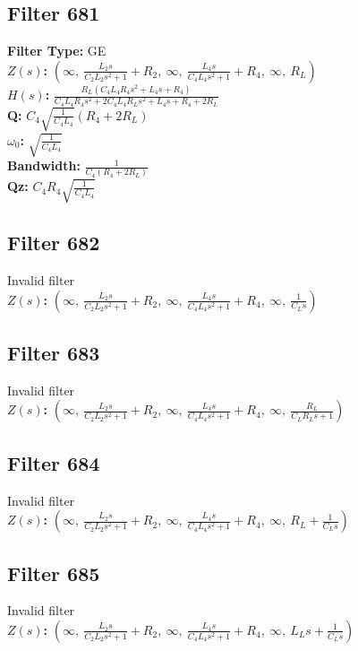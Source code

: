 \documentclass{article}
\begin{document}
\subsection*{Filter 681}
\textbf{Filter Type:} GE \\ 
\textbf{$Z(s)$:} $\left( \infty, \  \frac{L_{2} s}{C_{2} L_{2} s^{2} + 1} + R_{2}, \  \infty, \  \frac{L_{4} s}{C_{4} L_{4} s^{2} + 1} + R_{4}, \  \infty, \  R_{L}\right)$ \\ 
\textbf{$H(s)$:} $\frac{R_{L} \left(C_{4} L_{4} R_{4} s^{2} + L_{4} s + R_{4}\right)}{C_{4} L_{4} R_{4} s^{2} + 2 C_{4} L_{4} R_{L} s^{2} + L_{4} s + R_{4} + 2 R_{L}}$ \\ 
\textbf{Q:} $C_{4} \sqrt{\frac{1}{C_{4} L_{4}}} \left(R_{4} + 2 R_{L}\right)$ \\ 
\textbf{$\omega_0$:} $\sqrt{\frac{1}{C_{4} L_{4}}}$ \\ 
\textbf{Bandwidth:} $\frac{1}{C_{4} \left(R_{4} + 2 R_{L}\right)}$ \\ 
\textbf{Qz:} $C_{4} R_{4} \sqrt{\frac{1}{C_{4} L_{4}}}$ \\ 
\subsection*{Filter 682}
Invalid filter \\ 
\textbf{$Z(s)$:} $\left( \infty, \  \frac{L_{2} s}{C_{2} L_{2} s^{2} + 1} + R_{2}, \  \infty, \  \frac{L_{4} s}{C_{4} L_{4} s^{2} + 1} + R_{4}, \  \infty, \  \frac{1}{C_{L} s}\right)$ \\ 
\subsection*{Filter 683}
Invalid filter \\ 
\textbf{$Z(s)$:} $\left( \infty, \  \frac{L_{2} s}{C_{2} L_{2} s^{2} + 1} + R_{2}, \  \infty, \  \frac{L_{4} s}{C_{4} L_{4} s^{2} + 1} + R_{4}, \  \infty, \  \frac{R_{L}}{C_{L} R_{L} s + 1}\right)$ \\ 
\subsection*{Filter 684}
Invalid filter \\ 
\textbf{$Z(s)$:} $\left( \infty, \  \frac{L_{2} s}{C_{2} L_{2} s^{2} + 1} + R_{2}, \  \infty, \  \frac{L_{4} s}{C_{4} L_{4} s^{2} + 1} + R_{4}, \  \infty, \  R_{L} + \frac{1}{C_{L} s}\right)$ \\ 
\subsection*{Filter 685}
Invalid filter \\ 
\textbf{$Z(s)$:} $\left( \infty, \  \frac{L_{2} s}{C_{2} L_{2} s^{2} + 1} + R_{2}, \  \infty, \  \frac{L_{4} s}{C_{4} L_{4} s^{2} + 1} + R_{4}, \  \infty, \  L_{L} s + \frac{1}{C_{L} s}\right)$ \\ 
\end{document}
